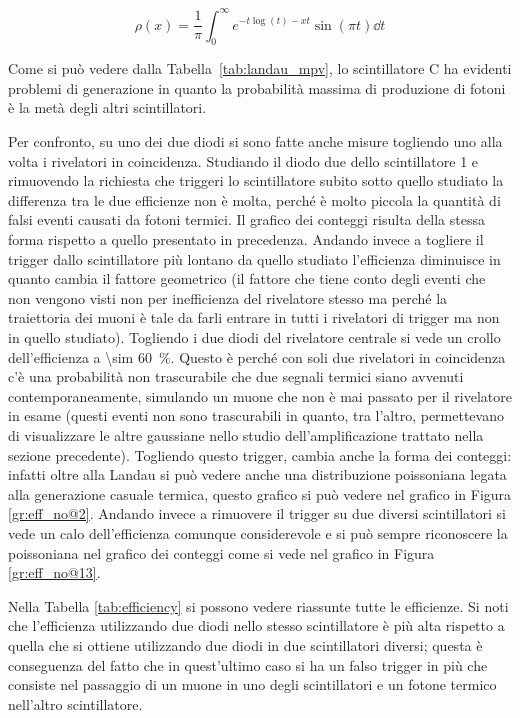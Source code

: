\begin{equation}
	\rho\left(x\right) = \frac{1}{\pi}\int_0^\infty e^{-t\log(t)-xt}\sin(\pi t) \dd t
	\label{eq:landau}
\end{equation}


Come si pu\`o vedere dalla Tabella~\ref{tab:landau_mpv}, lo scintillatore C ha evidenti problemi di generazione in quanto la probabilit\`a massima di produzione di fotoni \`e la met\`a degli altri scintillatori.

Per confronto, su uno dei due diodi si sono fatte anche misure togliendo uno alla volta i rivelatori in coincidenza. Studiando il diodo due dello scintillatore 1 e rimuovendo la richiesta che triggeri lo scintillatore subito sotto quello studiato la differenza tra le due efficienze non è molta, perché è molto piccola la quantità di falsi eventi causati da fotoni termici. Il grafico dei conteggi risulta della stessa forma rispetto a quello presentato in precedenza. Andando invece a togliere il trigger dallo scintillatore più lontano da quello studiato l'efficienza diminuisce in quanto cambia il fattore geometrico (il fattore che tiene conto degli eventi che non vengono visti non per inefficienza del rivelatore stesso ma perché la traiettoria dei muoni è tale da farli entrare in tutti i rivelatori di trigger ma non in quello studiato). Togliendo i due diodi del rivelatore centrale si vede un crollo dell'efficienza a \SI{\sim 60}{\percent}. Questo \`e perch\'e con soli due rivelatori in coincidenza c'\`e una probabilit\`a non trascurabile che due segnali termici siano avvenuti contemporaneamente, simulando un muone che non \`e mai passato per il rivelatore in esame (questi eventi non sono trascurabili in quanto, tra l'altro, permettevano di visualizzare le altre gaussiane nello studio dell'amplificazione trattato nella sezione precedente). Togliendo questo trigger, cambia anche la forma dei conteggi: infatti oltre alla Landau si può vedere anche una distribuzione poissoniana legata alla generazione casuale termica, questo grafico si può vedere nel grafico in Figura \ref{gr:eff_no@2}. Andando invece a rimuovere il trigger su due diversi scintillatori si vede un calo dell'efficienza comunque considerevole e si può sempre riconoscere la poissoniana nel grafico dei conteggi come si vede nel grafico in Figura \ref{gr:eff_no@13}.\\

Nella Tabella \ref{tab:efficiency} si possono vedere riassunte tutte le efficienze. Si noti che l'efficienza utilizzando due diodi nello stesso scintillatore è più alta rispetto a quella che si ottiene utilizzando due diodi in due scintillatori diversi; questa è conseguenza del fatto che in quest'ultimo caso si ha un falso trigger in più che consiste nel passaggio di un muone in uno degli scintillatori e un fotone termico nell'altro scintillatore.

